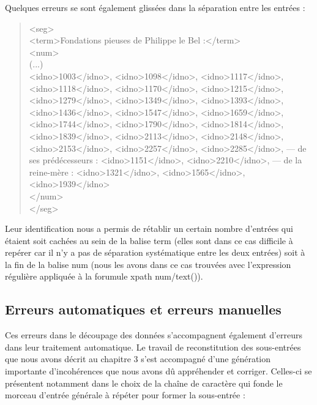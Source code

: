 \documentclass[a4paper,12pt,twoside]{book}
\begin{document}
	Quelques erreurs se sont également glissées dans la séparation entre les entrées :
	
	\begin{quotation}
               	<seg>\\
					\indent\indent<term>Fondations pieuses de Philippe le Bel :</term>\\
					\indent\indent<num>\\
						\indent\indent\indent (...)\\
						\indent\indent\indent<idno>1003</idno>, <idno>1098</idno>, <idno>1117</idno>, 
						\indent\indent\indent <idno>1118</idno>, 
						<idno>1170</idno>, <idno>1215</idno>, 
						\indent\indent\indent <idno>1279</idno>, <idno>1349</idno>, 
						<idno>1393</idno>, 
						\indent\indent\indent <idno>1436</idno>, <idno>1547</idno>, <idno>1659</idno>,
						\indent\indent\indent <idno>1744</idno>, <idno>1790</idno>, <idno>1814</idno>, 
						\indent\indent\indent <idno>1839</idno>, 
						<idno>2113</idno>, <idno>2148</idno>, 
						\indent\indent\indent<idno>2153</idno>, <idno>2257</idno>, 
						<idno>2285</idno>,
						 \indent\indent\indent — de ses prédécesseurs : <idno>1151</idno>, <idno>2210</idno>, 
						 \indent\indent\indent — de la reine-mère : <idno>1321</idno>, <idno>1565</idno>, \indent\indent\indent<idno>1939</idno>\\
					\indent\indent</num>\\
				\indent</seg>
	\end{quotation}
	
	\noindent Leur identification nous a permis de rétablir un certain nombre d'entrées qui étaient soit cachées au sein de la balise \og term\fg{} (elles sont dans ce cas difficile à repérer car il n'y a pas de séparation systématique entre les deux entrées) soit à la fin de la balise \og num\fg{} (nous les avons dans ce cas trouvées avec l'expression régulière \og [A-Za-z]\fg{} appliquée à la forumule xpath \og num/text()\fg{}). 
	
	\subsection{Erreurs automatiques et erreurs manuelles}
	
	Ces erreurs dans le découpage des données s'accompagnent également d'erreurs dans leur traitement automatique. Le travail de reconstitution des sous-entrées que nous avons décrit au chapitre 3 s'est accompagné d'une génération importante d'incohérences que nous avons dû appréhender et corriger. Celles-ci se présentent notamment dans le choix de la chaîne de caractère qui fonde le morceau d'entrée générale à répéter pour former la sous-entrée :
	
\end{document}
